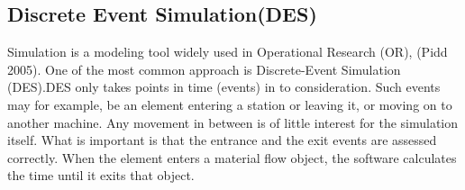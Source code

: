 \subsection{Discrete Event Simulation(DES)}
Simulation is a modeling tool widely used in Operational Research (OR), (Pidd 2005). One of the most common approach is Discrete-Event Simulation (DES).DES only takes points in time (events) in to consideration. Such events may for example, be an element entering a station or leaving it, or moving on to another machine. Any movement in between is of little interest for the simulation itself. What is important is that the entrance and the exit events are assessed correctly. When the element enters a material flow object, the software calculates the time until it exits that object. 
